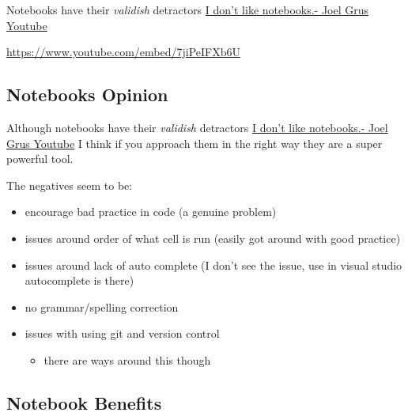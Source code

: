 \documentclass[
  letterpaper,
  DIV=11,
  numbers=noendperiod]{scrartcl}
\providecommand{\tightlist}{%
  \setlength{\itemsep}{0pt}\setlength{\parskip}{0pt}}\usepackage{longtable,booktabs,array}
\begin{document}
Notebooks have their \emph{validish} detractors
\href{https://www.youtube.com/watch?v=7jiPeIFXb6U}{I don't like
notebooks.- Joel Grus Youtube}

\url{https://www.youtube.com/embed/7jiPeIFXb6U}

\hypertarget{notebooks-opinion}{%
\subsection{Notebooks Opinion}\label{notebooks-opinion}}

Although notebooks have their \emph{validish} detractors
\href{https://www.youtube.com/watch?v=7jiPeIFXb6U}{I don't like
notebooks.- Joel Grus Youtube} I think if you approach them in the right
way they are a super powerful tool.

The negatives seem to be:

\begin{itemize}
\tightlist
\item
  encourage bad practice in code (a genuine problem)
\item
  issues around order of what cell is run (easily got around with good
  practice)
\item
  issues around lack of auto complete (I don't see the issue, use in
  visual studio autocomplete is there)
\item
  no grammar/spelling correction
\item
  issues with using git and version control

  \begin{itemize}
  \tightlist
  \item
    there are ways around this though
  \end{itemize}
\end{itemize}

\hypertarget{notebook-benefits}{%
\subsection{Notebook Benefits}\label{notebook-benefits}}
\end{document}
